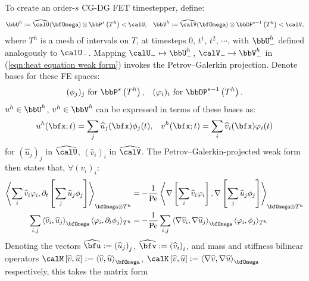 \begin{example}
        To create an order-$s$ CG-DG FET timestepper, define:
        \begin{align}
            \bbU^{h}  :=  \widehat{\calU}(\bfOmega)\otimes\bbP^{s}\left(T^{h}\right)  <  \calU,  &&
            \bbV^{h}  :=  \widehat{\calV}(\bfOmega)\otimes\bbDP^{s - 1}\left(T^{h}\right)  <  \calV,
        \end{align}
        where $T^{h}$ is a mesh of intervals on $T$, at timesteps $0$, $t^{1}$, $t^{2}$, $\cdots$, with $\bbU^{h}_{-}$ defined analogously to $\calU_{-}$. Mapping $\calU_{-}  \mapsto  \bbU^{h}_{-}$, $\calV_{-}  \mapsto  \bbV^{h}_{-}$ in (\ref{eqn:heat equation weak form}) invokes the Petrov–Galerkin projection. Denote bases for these FE spaces:
        \begin{align}
            (\phi_{j})_{j}     \text{ for }  \bbP^{s}\left(T^{h}\right),         &&
            (\varphi_{i})_{i}  \text{ for }  \bbDP^{s - 1}\left(T^{h}\right).
        \end{align}
        $u^{h}  \in  \bbU^{h}$, $v^{h}  \in  \bbV^{h}$ can be expressed in terms of these bases as:
        \begin{align}
            u^{h}(\bfx; t)  =  \sum_{j}\widehat{u}_{j}(\bfx)\phi_{j}(t),  &&
            v^{h}(\bfx; t)  =  \sum_{i}\widehat{v}_{i}(\bfx)\varphi_{i}(t)
        \end{align}
        for $\left(\widehat{u}_{j}\right)_{j}$ in $\widehat{\calU}$, $\left(\widehat{v}_{i}\right)_{i}$ in $\widehat{\calV}$. The Petrov–Galerkin-projected weak form then states that, $\forall  (v_{i})_{i}$:
        \begin{align}
            \left\langle\sum_{i}\widehat{v}_{i}\varphi_{i}, \partial_{t}\left[\sum_{j}\widehat{u}_{j}\phi_{j}\right]\right\rangle_{\bfOmega\otimes T^{h}}  &=  - \frac{1}{\rmPe}\left\langle\nabla\left[\sum_{i}\widehat{v}_{i}\varphi_{i}\right], \nabla\left[\sum_{j}\widehat{u}_{j}\phi_{j}\right]\right\rangle_{\bfOmega\otimes T^{h}}  \\
            \sum_{i, j}\left\langle\widehat{v}_{i}, \widehat{u}_{j}\right\rangle_{\bfOmega}\langle\varphi_{i}, \partial_{t}\phi_{j}\rangle_{T^{h}}  &=  - \frac{1}{\rmPe}\sum_{i, j}\left\langle\nabla\widehat{v}_{i}, \nabla\widehat{u}_{j}\right\rangle_{\bfOmega}\langle\varphi_{i}, \phi_{j}\rangle_{T^{h}}
        \end{align}
        Denoting the vectors $\widehat{\bfu}  :=  \left(\widehat{u}_{j}\right)_{j}$, $\widehat{\bfv}  :=  \left(\widehat{v}_{i}\right)_{i}$, and mass and stiffness bilinear operators $\calM\left[\widehat{v}, \widehat{u}\right]  :=  \left\langle\widehat{v}, \widehat{u}\right\rangle_{\bfOmega}$, $\calK\left[\widehat{v}, \widehat{u}\right]  :=  \left\langle\nabla\widehat{v}, \nabla\widehat{u}\right\rangle_{\bfOmega}$ respectively, this takes the matrix form

\end{example}
